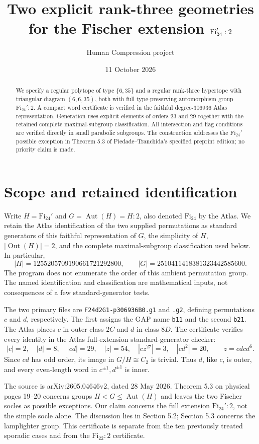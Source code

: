 \documentclass[11pt]{article}
\title{Two explicit rank-three geometries for the Fischer extension $\Fi_{24}':2$}
\author{Human Compression project}
\date{11 October 2026}
\newcommand{\Fi}{\mathrm{Fi}}
\begin{document}
\maketitle
\begin{abstract}
We specify a regular polytope of type $\{6,35\}$ and a regular rank-three hypertope with triangular diagram $(6,6,35)$, both with full type-preserving automorphism group $\Fi_{24}':2$. A compact word certificate is verified in the faithful degree-$306936$ Atlas representation. Generation uses explicit elements of orders $23$ and $29$ together with the retained complete maximal-subgroup classification. All intersection and flag conditions are verified directly in small parabolic subgroups. The construction addresses the $\Fi_{24}'$ possible exception in Theorem 5.3 of Piedade--Tranchida's specified preprint edition; no priority claim is made.
\end{abstract}
\section{Scope and retained identification}
Write $H=\Fi_{24}'$ and $G=\operatorname{Aut}(H)=H:2$, also denoted $\Fi_{24}$ by the Atlas. We retain the Atlas identification of the two supplied permutations as standard generators of this faithful representation of $G$, the simplicity of $H$, $|\operatorname{Out}(H)|=2$, and the complete maximal-subgroup classification used below. In particular,
\[
 |H|=1255205709190661721292800,\qquad
 |G|=2510411418381323442585600.
\]
The program does not enumerate the order of this ambient permutation group. The named identification and classification are mathematical inputs, not consequences of a few standard-generator tests.

The two primary files are \texttt{F24d2G1-p306936B0.g1} and \texttt{.g2}, defining permutations $c$ and $d$, respectively. The first assigns the GAP name \texttt{b11} and the second \texttt{b21}. The Atlas places $c$ in outer class $2C$ and $d$ in class $8D$. The certificate verifies every identity in the Atlas full-extension standard-generator checker:
\[
 |c|=2,\quad |d|=8,\quad |cd|=29,\quad
 |z|=54,\quad |cz^{27}|=3,\quad |cd^2|=20,
 \qquad z=cdcd^6.
\]
Since $cd$ has odd order, its image in $G/H\cong C_2$ is trivial. Thus $d$, like $c$, is outer, and every even-length word in $c^{\pm1},d^{\pm1}$ is inner.

The source is arXiv:2605.04646v2, dated 28 May 2026. Theorem 5.3 on physical pages 19--20 concerns groups $H<G\leq\operatorname{Aut}(H)$ and leaves the two Fischer socles as possible exceptions. Our claim concerns the full extension $\Fi_{24}':2$, not the simple socle alone. The discussion lies in Section 5.2; Section 5.3 concerns the lamplighter group. This certificate is separate from the ten previously treated sporadic cases and from the $\Fi_{22}:2$ certificate.
\end{document}
